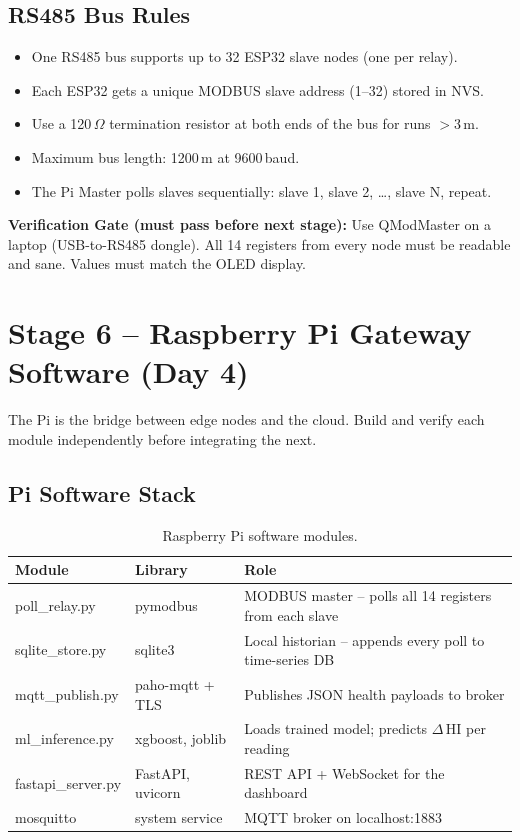 \documentclass[12pt,a4paper]{article}
\newenvironment{checkgate}{%
  \begin{mdframed}[backgroundcolor=yellow!10,linecolor=orange!70,linewidth=1.5pt,
    innerleftmargin=9pt,innerrightmargin=9pt,innertopmargin=5pt,innerbottommargin=5pt]
  \textbf{\color{orange!70!black}Verification Gate (must pass before next stage): }}{\end{mdframed}}
\begin{document}
\subsection{RS485 Bus Rules}

\begin{itemize}[noitemsep]
  \item One RS485 bus supports up to 32 ESP32 slave nodes (one per relay).
  \item Each ESP32 gets a unique MODBUS slave address (1--32) stored in NVS.
  \item Use a 120\,$\Omega$ termination resistor at both ends of the bus for runs $>$3\,m.
  \item Maximum bus length: 1200\,m at 9600\,baud.
  \item The Pi Master polls slaves sequentially: slave 1, slave 2, \ldots{}, slave N, repeat.
\end{itemize}

\begin{checkgate}
Use QModMaster on a laptop (USB-to-RS485 dongle). All 14 registers from every node must be readable and
sane. Values must match the OLED display.
\end{checkgate}

\section{Stage 6 -- Raspberry Pi Gateway Software (Day 4)}

The Pi is the bridge between edge nodes and the cloud. Build and verify each module independently before
integrating the next.

\subsection{Pi Software Stack}

\begin{table}[H]
\centering
\begin{tabularx}{\textwidth}{llX}
\toprule
\textbf{Module} & \textbf{Library} & \textbf{Role} \\
\midrule
poll\_relay.py     & pymodbus         & MODBUS master -- polls all 14 registers from each slave \\
sqlite\_store.py   & sqlite3          & Local historian -- appends every poll to time-series DB \\
mqtt\_publish.py   & paho-mqtt + TLS  & Publishes JSON health payloads to broker \\
ml\_inference.py   & xgboost, joblib  & Loads trained model; predicts $\Delta$\,HI per reading \\
fastapi\_server.py & FastAPI, uvicorn & REST API + WebSocket for the dashboard \\
mosquitto          & system service   & MQTT broker on localhost:1883 \\
\bottomrule
\end{tabularx}
\caption{Raspberry Pi software modules.}
\end{table}
\end{document}
